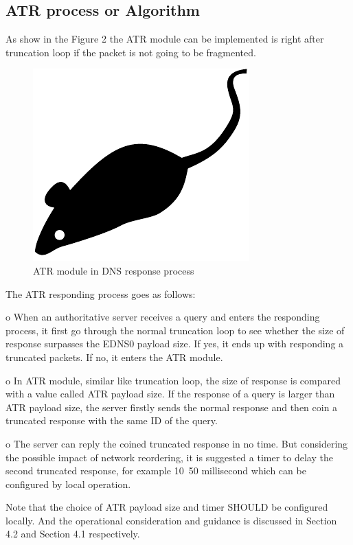 \subsection{ATR process or Algorithm}

As show in the Figure 2 the ATR module can be implemented is right after truncation loop if the packet is not going to be fragmented.

\begin{figure}[tp]
\centering
\includegraphics{figures/mouse}
\caption{ATR module in DNS response process}
\end{figure}

The ATR responding process goes as follows:

   o  When an authoritative server receives a query and enters the
      responding process, it first go through the normal truncation loop
      to see whether the size of response surpasses the EDNS0 payload
      size.  If yes, it ends up with responding a truncated packets.  If
      no, it enters the ATR module.

   o  In ATR module, similar like truncation loop, the size of response
      is compared with a value called ATR payload size.  If the response
      of a query is larger than ATR payload size, the server firstly
      sends the normal response and then coin a truncated response with
      the same ID of the query.

   o  The server can reply the coined truncated response in no time.
      But considering the possible impact of network reordering, it is
      suggested a timer to delay the second truncated response, for
      example 10~50 millisecond which can be configured by local
      operation.

   Note that the choice of ATR payload size and timer SHOULD be
   configured locally.  And the operational consideration and guidance
   is discussed in Section 4.2 and Section 4.1 respectively.


